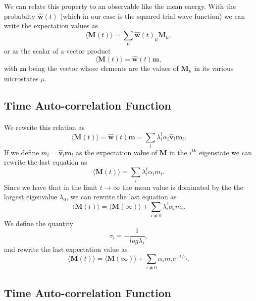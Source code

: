 \documentclass[%
oneside,                 %
final,                   %
10pt]{article}
\begin{document}
We can relate this property to an observable like the mean energy.
With the probabilty $\mathbf{\hat{w}}(t)$ (which in our case is the squared trial wave function) we
can write the expectation values as 
\[
 \langle \mathbf{M}(t) \rangle  = \sum_{\mu} \mathbf{\hat{w}}(t)_{\mu}\mathbf{M}_{\mu},
\] 
or as the scalar of a  vector product
 \[
 \langle \mathbf{M}(t) \rangle  = \mathbf{\hat{w}}(t)\mathbf{m},
\] 
with $\mathbf{m}$ being the vector whose elements are the values of $\mathbf{M}_{\mu}$ in its 
various microstates $\mu$.



\subsection*{Time Auto-correlation Function}


\paragraph{}

We rewrite this relation  as
 \[
 \langle \mathbf{M}(t) \rangle  = \mathbf{\hat{w}}(t)\mathbf{m}=\sum_i\lambda_i^t\alpha_i\mathbf{\hat{v}}_i\mathbf{m}_i.
\] 
If we define $m_i=\mathbf{\hat{v}}_i\mathbf{m}_i$ as the expectation value of
$\mathbf{M}$ in the $i^{\mathrm{th}}$ eigenstate we can rewrite the last equation as
 \[
 \langle \mathbf{M}(t) \rangle  = \sum_i\lambda_i^t\alpha_im_i.
\] 
Since we have that in the limit $t\rightarrow \infty$ the mean value is dominated by the 
the largest eigenvalue $\lambda_0$, we can rewrite the last equation as
 \[
 \langle \mathbf{M}(t) \rangle  = \langle \mathbf{M}(\infty) \rangle+\sum_{i\ne 0}\lambda_i^t\alpha_im_i.
\] 
We define the quantity
\[
   \tau_i=-\frac{1}{log\lambda_i},
\]
and rewrite the last expectation value as
 \[
 \langle \mathbf{M}(t) \rangle  = \langle \mathbf{M}(\infty) \rangle+\sum_{i\ne 0}\alpha_im_ie^{-t/\tau_i}.
\label{eq:finalmeanm}
\]



\subsection*{Time Auto-correlation Function}

\paragraph{}
\end{document}
